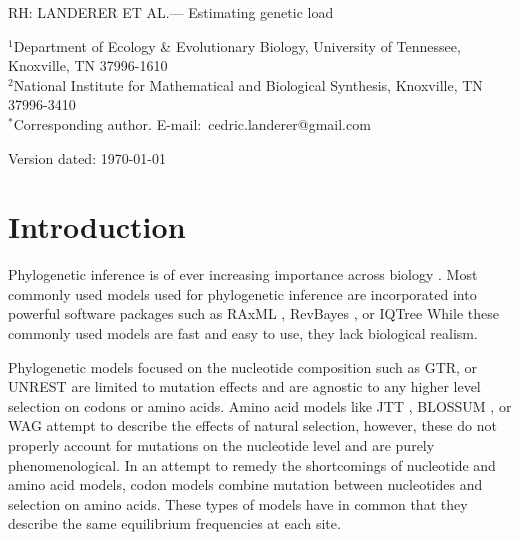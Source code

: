 \documentclass[12pt]{article}
\begin{document}
\doublespacing
\linenumbers


\newcommand{\Lik}{\ensuremath{\text{\emph{L}}}\xspace}
\newcommand{\selacDMS}{\emph{SelAC}+DMS\xspace}
\newcommand{\phydms}{\emph{phydms}\xspace}
\newcommand{\selac}{\emph{SelAC}\xspace}
\newcommand{\ecoli}{\textit{E. coli}\xspace}
\newcommand{\gy}{\emph{GY94}\xspace}

\noindent RH: LANDERER ET AL.--- Estimating genetic load
\bigskip
\medskip
\begin{center}

\bigskip



\end{center}

\vfill

{\small
\noindent$^{1}$Department of Ecology \& Evolutionary Biology, University of Tennessee, Knoxville, TN 37996-1610\\
\noindent$^{2}$National Institute for Mathematical and Biological Synthesis, Knoxville, TN 37996-3410\\
\noindent$^{*}$Corresponding author. E-mail:~cedric.landerer@gmail.com
}

\vfill
\centerline{Version dated: \today}
\vfill
\newpage


\section*{Introduction}
Phylogenetic inference is of ever increasing importance across biology \citep{omeara2006,YangAndBourne2009,Ruprecht2017,SchwartzAndSchaffer2017}. 
Most commonly used models used for phylogenetic inference are incorporated into powerful software packages such as RAxML \citep{raxml}, RevBayes \citep{revbayes}, or IQTree \citep{nguyen2015}
While these commonly used models are fast and easy to use, they lack biological realism.

Phylogenetic models focused on the nucleotide composition such as GTR, or UNREST \citep{Tavare1986,Yang1994} are limited to mutation effects and are agnostic to any higher level selection on codons or amino acids.
Amino acid models like JTT \citep{jones1992}, BLOSSUM \citep{blossum}, or WAG \citep{whelan2001} attempt to describe the effects of natural selection, however, these do not properly account for mutations on the nucleotide level and are purely phenomenological.
In an attempt to remedy the shortcomings of nucleotide and amino acid models, codon models combine mutation between nucleotides and selection on amino acids.
These types of models have in common that they describe the same equilibrium frequencies at each site.
\end{document}
